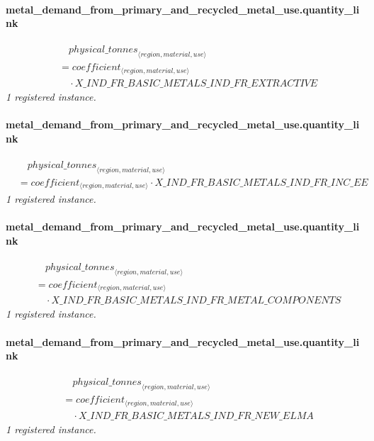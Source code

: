 \documentclass[11pt]{article}
\begin{document}
\paragraph{metal\_demand\_from\_primary\_and\_recycled\_metal\_use.quantity\_link}
\begin{align*}
&\quad {physical\_tonnes}_{\langle region, material, use\rangle}\\
&= coefficient_{\langle region, material, use\rangle}\\
&\quad {}\cdot X\_IND\_FR\_BASIC\_METALS\_IND\_FR\_EXTRACTIVE
\end{align*}
\noindent\emph{1 registered instance.}\par
\paragraph{metal\_demand\_from\_primary\_and\_recycled\_metal\_use.quantity\_link}
\begin{align*}
&\quad {physical\_tonnes}_{\langle region, material, use\rangle}\\
&= coefficient_{\langle region, material, use\rangle} \cdot X\_IND\_FR\_BASIC\_METALS\_IND\_FR\_INC\_EE
\end{align*}
\noindent\emph{1 registered instance.}\par
\paragraph{metal\_demand\_from\_primary\_and\_recycled\_metal\_use.quantity\_link}
\begin{align*}
&\quad {physical\_tonnes}_{\langle region, material, use\rangle}\\
&= coefficient_{\langle region, material, use\rangle}\\
&\quad {}\cdot X\_IND\_FR\_BASIC\_METALS\_IND\_FR\_METAL\_COMPONENTS
\end{align*}
\noindent\emph{1 registered instance.}\par
\paragraph{metal\_demand\_from\_primary\_and\_recycled\_metal\_use.quantity\_link}
\begin{align*}
&\quad {physical\_tonnes}_{\langle region, material, use\rangle}\\
&= coefficient_{\langle region, material, use\rangle}\\
&\quad {}\cdot X\_IND\_FR\_BASIC\_METALS\_IND\_FR\_NEW\_ELMA
\end{align*}
\noindent\emph{1 registered instance.}\par
\end{document}
